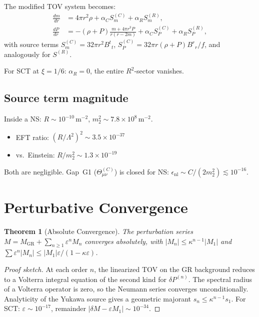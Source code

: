 \documentclass[12pt,a4paper]{article}
\newtheorem{theorem}{Theorem}[section]
\newcommand{\Lam}{\Lambda}
\begin{document}
The modified TOV system becomes:
\begin{align}
  \frac{dm}{dr} &= 4\pi r^2\rho + \alpha_C S_m^{(C)} + \alpha_R S_m^{(R)}, \\
  \frac{dP}{dr} &= -(\rho+P)\frac{m+4\pi r^3P}{r(r-2m)}
  + \alpha_C S_P^{(C)} + \alpha_R S_P^{(R)},
\end{align}
with source terms $S_m^{(C)} = 32\pi r^2 B^t{}_t$,
$S_P^{(C)} = 32\pi r(\rho+P)B^r{}_r/f$, and analogously for $S^{(R)}$.

For SCT at $\xi = 1/6$: $\alpha_R = 0$, the entire $R^2$-sector vanishes.

\subsection{Source term magnitude}

Inside a NS: $R \sim 10^{-10}$\,m$^{-2}$, $m_2^2 \sim 7.8 \times 10^8$\,m$^{-2}$.
\begin{itemize}
  \item EFT ratio: $(R/\Lam^2)^2 \sim 3.5 \times 10^{-37}$
  \item vs.\ Einstein: $R/m_2^2 \sim 1.3 \times 10^{-19}$
\end{itemize}
Both are negligible.  Gap~G1 ($\Theta^{(C)}_{\mu\nu}$) is closed for NS:
$\epsilon_{\mathrm{nl}} \sim C/(2m_2^2) \lesssim 10^{-16}$.

\section{Perturbative Convergence}
\label{sec:convergence}

\begin{theorem}[Absolute Convergence]
\label{thm:convergence}
The perturbation series $M = M_{\mathrm{GR}} + \sum_{n\geq1}\varepsilon^n M_n$
converges absolutely, with $|M_n| \leq \kappa^{n-1}|M_1|$ and
$\sum \varepsilon^n|M_n| \leq |M_1|\varepsilon/(1-\kappa\varepsilon)$.
\end{theorem}

\begin{proof}[Proof sketch]
At each order $n$, the linearized TOV on the GR background reduces to a
Volterra integral equation of the second kind for $\delta P^{(n)}$.
The spectral radius of a Volterra operator is zero, so the Neumann series
converges unconditionally.  Analyticity of the Yukawa source gives a
geometric majorant $s_n \leq \kappa^{n-1}s_1$.
For SCT: $\varepsilon \sim 10^{-17}$, remainder
$|\delta M - \varepsilon M_1| \sim 10^{-34}$.
\end{proof}
\end{document}
